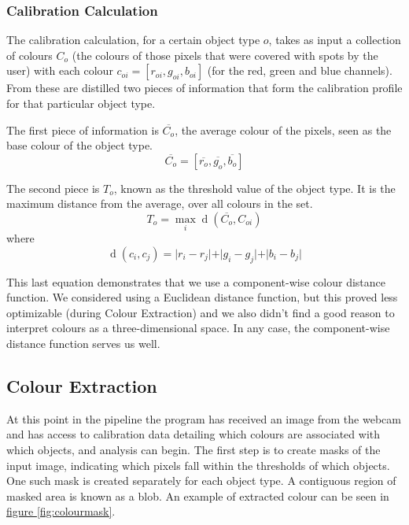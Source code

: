 \documentclass[10pt, abstracton, twocolumn]{scrartcl}
\DeclareMathOperator{\dist}{d}
\newcommand{\fref}[1]{\hyperref[#1]{figure \vref{#1}}}
\begin{document}
\subsubsection{Calibration Calculation}

The calibration calculation, for a certain object type $o$, takes as input a collection of colours $C_o$ (the colours of those pixels that were covered with spots by the user) with each colour $c_{oi} = [r_{oi},g_{oi},b_{oi}]$ (for the red, green and blue channels). From these are distilled two pieces of information that form the calibration profile for that particular object type.

\begin{samepage}

The first piece of information is $\overline{C_o}$, the average colour of the pixels, seen as the base colour of the object type.
\nolinebreak
\[
\overline{C_o} = [ \overline{r_o},\overline{g_o},\overline{b_o} ]
\]

\end{samepage}

\begin{samepage}

The second piece is $T_o$, known as the threshold value of the object type. It is the maximum distance from the average, over all colours in the set.
\nolinebreak
\[
T_o = \max_{i} \dist( \overline{C_o}, C_{oi} )
\]
\nolinebreak
where
\nolinebreak
\[
\dist(c_i,c_j) = \vert r_{i}-r_{j} \vert + \vert g_{i}-g_{j} \vert + \vert b_{i}-b_{j} \vert 
\]

\end{samepage}


This last equation demonstrates that we use a component-wise colour distance function. We considered using a Euclidean distance function, but this proved less optimizable (during Colour Extraction) and we also didn't find a good reason to interpret colours as a three-dimensional space. In any case, the component-wise distance function serves us well.

\subsection{Colour Extraction}
At this point in the pipeline the program has received an image from the webcam and has access to calibration data detailing which colours are associated with which objects, and analysis can begin. The first step is to create masks of the input image, indicating which pixels fall within the thresholds of which objects. One such mask is created separately for each object type. A contiguous region of masked area is known as a blob. An example of extracted colour can be seen in \fref{fig:colourmask}.
\end{document}
